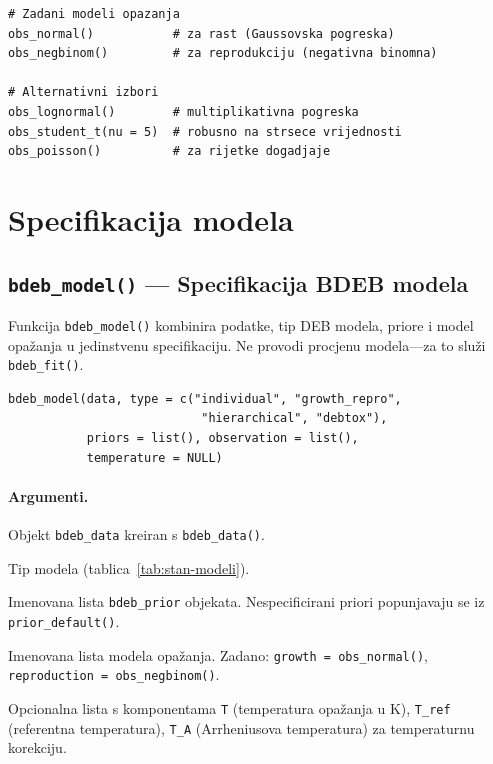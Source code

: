 \documentclass[11pt,a4paper]{article}
\newcommand{\fn}[1]{\texttt{#1()}}
\newcommand{\code}[1]{\texttt{#1}}
\begin{document}
\begin{lstlisting}
# Zadani modeli opazanja
obs_normal()           # za rast (Gaussovska pogreska)
obs_negbinom()         # za reprodukciju (negativna binomna)

# Alternativni izbori
obs_lognormal()        # multiplikativna pogreska
obs_student_t(nu = 5)  # robusno na strsece vrijednosti
obs_poisson()          # za rijetke dogadjaje
\end{lstlisting}


\section{Specifikacija modela}
\label{sec:specifikacija}

\subsection{\fn{bdeb\_model} --- Specifikacija BDEB modela}

Funkcija \fn{bdeb\_model} kombinira podatke, tip DEB modela, priore i
model opažanja u jedinstvenu specifikaciju.  Ne provodi procjenu
modela---za to služi \fn{bdeb\_fit}.

\begin{lstlisting}
bdeb_model(data, type = c("individual", "growth_repro",
                           "hierarchical", "debtox"),
           priors = list(), observation = list(),
           temperature = NULL)
\end{lstlisting}

\paragraph{Argumenti.}
\begin{description}[nosep,leftmargin=3.5cm,style=nextline]
  \item[\code{data}] Objekt \code{bdeb\_data} kreiran s \fn{bdeb\_data}.
  \item[\code{type}] Tip modela (tablica~\ref{tab:stan-modeli}).
  \item[\code{priors}] Imenovana lista \code{bdeb\_prior} objekata.
    Nespecificirani priori popunjavaju se iz \fn{prior\_default}.
  \item[\code{observation}] Imenovana lista modela opažanja.  Zadano:
    \code{growth = obs\_normal()}, \code{reproduction = obs\_negbinom()}.
  \item[\code{temperature}] Opcionalna lista s komponentama \code{T}
    (temperatura opažanja u K), \code{T\_ref} (referentna temperatura),
    \code{T\_A} (Arrheniusova temperatura) za temperaturnu korekciju.
\end{description}
\end{document}

